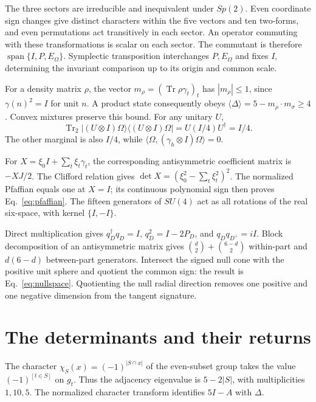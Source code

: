 \documentclass[aps,prx,reprint,longbibliography]{revtex4-2}
\providecommand{\Tr}{\operatorname{Tr}}
\begin{document}
The three sectors are irreducible and inequivalent under $Sp(2)$. Even coordinate sign changes give distinct characters within the five vectors and ten two-forms, and even permutations act transitively in each sector. An operator commuting with these transformations is scalar on each sector. The commutant is therefore $\operatorname{span}\{I,P,E_\Omega\}$. Symplectic transposition interchanges $P,E_\Omega$ and fixes $I$, determining the invariant comparison up to its origin and common scale.

For a density matrix $\rho$, the vector $m_\rho=(\Tr\rho\gamma_t)_t$ has $|m_\rho|\leq1$, since $\gamma(n)^2=I$ for unit $n$. A product state consequently obeys $\langle\Delta\rangle=5-m_\rho\cdot m_\sigma\geq4$. Convex mixtures preserve this bound. For any unitary $U$,
\begin{equation}
 \Tr_2|(U\otimes I)\Omega\rangle\langle(U\otimes I)\Omega|
 =U(I/4)U^\dagger=I/4.
 \label{ap:marginals}
\end{equation}
The other marginal is also $I/4$, while $\langle\Omega,(\gamma_h\otimes I)\Omega\rangle=0$.

For $X=\xi_0I+\sum_t \xi_t\gamma_t$, the corresponding antisymmetric coefficient matrix is $-XJ/2$. The Clifford relation gives $\det X=(\xi_0^2-\sum_t \xi_t^2)^2$. The normalized Pfaffian equals one at $X=I$; its continuous polynomial sign then proves Eq.~\eqref{eq:pfaffian}. The fifteen generators of $SU(4)$ act as all rotations of the real six-space, with kernel $\{I,-I\}$.

Direct multiplication gives $q_D^\dagger q_D=I$, $q_D^2=I-2P_D$, and $q_Dq_{D^\perp}=iI$. Block decomposition of an antisymmetric matrix gives $\binom d2+\binom{6-d}2$ within-part and $d(6-d)$ between-part generators. Intersect the signed null cone with the positive unit sphere and quotient the common sign: the result is Eq.~\eqref{eq:nullspace}. Quotienting the null radial direction removes one positive and one negative dimension from the tangent signature.

\section{The determinants and their returns}
\label{app:return}

The character $\chi_S(x)=(-1)^{|S\cap x|}$ of the even-subset group takes the value $(-1)^{[t\in S]}$ on $g_t$. Thus the adjacency eigenvalue is $5-2|S|$, with multiplicities $1,10,5$. The normalized character transform identifies $5I-A$ with $\Delta$.
\end{document}
